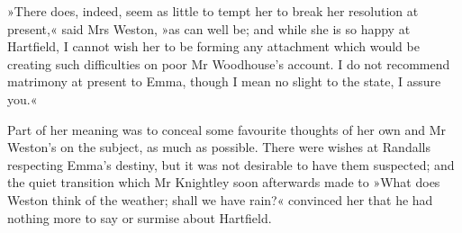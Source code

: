 »There does, indeed, seem as little to tempt her to break her resolution at present,« said Mrs Weston, »as can well be; and while she is so happy at Hartfield, I cannot wish her to be forming any attachment which would be creating such difficulties on poor Mr Woodhouse's account. I do not recommend matrimony at present to Emma, though I mean no slight to the state, I assure you.«

Part of her meaning was to conceal some favourite thoughts of her own and Mr Weston's on the subject, as much as possible. There were wishes at Randalls respecting Emma's destiny, but it was not desirable to have them suspected; and the quiet transition which Mr Knightley soon afterwards made to »What does Weston think of the weather; shall we have rain?« convinced her that he had nothing more to say or surmise about Hartfield.